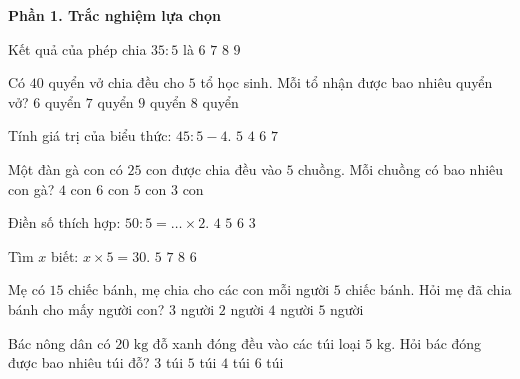 \textbf{Phần 1. Trắc nghiệm lựa chọn}

\begin{ex} %
Kết quả của phép chia $35 : 5$ là
\choice
{$6$}
{\True $7$}
{$8$}
{$9$}
\end{ex}

\begin{ex} %
Có $40$ quyển vở chia đều cho $5$ tổ học sinh. Mỗi tổ nhận được bao nhiêu quyển vở?
\choice
{$6$ quyển}
{$7$ quyển}
{$9$ quyển}
{\True $8$ quyển}
\end{ex}

\begin{ex} %
Tính giá trị của biểu thức: $45 : 5 - 4$.
\choice
{\True $5$}
{$4$}
{$6$}
{$7$}
\end{ex}

\begin{ex} %
Một đàn gà con có $25$ con được chia đều vào $5$ chuồng. Mỗi chuồng có bao nhiêu con gà?
\choice
{$4$ con}
{$6$ con}
{\True $5$ con}
{$3$ con}
\end{ex}

\begin{ex} %
Điền số thích hợp: $50 : 5 = \dots \times 2$.
\choice
{$4$}
{\True $5$}
{$6$}
{$3$}
\end{ex}

\begin{ex} %
Tìm $x$ biết: $x \times 5 = 30$.
\choice
{$5$}
{$7$}
{$8$}
{\True $6$}
\end{ex}

\begin{ex} %
Mẹ có $15$ chiếc bánh, mẹ chia cho các con mỗi người $5$ chiếc bánh. Hỏi mẹ đã chia bánh cho mấy người con?
\choice
{\True $3$ người}
{$2$ người}
{$4$ người}
{$5$ người}
\end{ex}

\begin{ex} %
Bác nông dân có $20\text{ kg}$ đỗ xanh đóng đều vào các túi loại $5\text{ kg}$. Hỏi bác đóng được bao nhiêu túi đỗ?
\choice
{$3$ túi}
{$5$ túi}
{\True $4$ túi}
{$6$ túi}
\end{ex}

